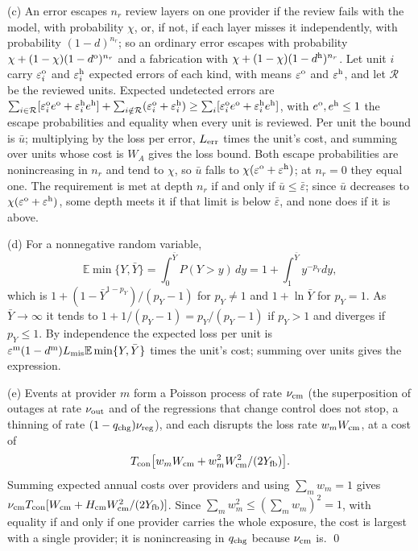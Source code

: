 (c) An error escapes $n_r$ review layers on one provider if the review fails with the model, with probability $\chi$, or, if not, if each layer misses it independently, with probability $(1-d)^{n_r}$; so an ordinary error escapes with probability $\chi+(1-\chi)(1-d^{\rm o})^{n_r}$ and a fabrication with $\chi+(1-\chi)(1-d^{\rm h})^{n_r}$. Let unit $i$ carry $\varepsilon^{\rm o}_i$ and $\varepsilon^{\rm h}_i$ expected errors of each kind, with means $\varepsilon^{\rm o}$ and $\varepsilon^{\rm h}$, and let $\mathcal R$ be the reviewed units. Expected undetected errors are $\sum_{i\in\mathcal R}[\varepsilon^{\rm o}_i e^{\rm o}+\varepsilon^{\rm h}_ie^{\rm h}]+\sum_{i\notin\mathcal R}(\varepsilon^{\rm o}_i+\varepsilon^{\rm h}_i)\ge\sum_i[\varepsilon^{\rm o}_ie^{\rm o}+\varepsilon^{\rm h}_ie^{\rm h}]$, with $e^{\rm o},e^{\rm h}\le1$ the escape probabilities and equality when every unit is reviewed. Per unit the bound is $\bar u$; multiplying by the loss per error, $L_{\rm err}$ times the unit's cost, and summing over units whose cost is $W_A$ gives the loss bound. Both escape probabilities are nonincreasing in $n_r$ and tend to $\chi$, so $\bar u$ falls to $\chi(\varepsilon^{\rm o}+\varepsilon^{\rm h})$; at $n_r=0$ they equal one. The requirement is met at depth $n_r$ if and only if $\bar u\le\bar\varepsilon$; since $\bar u$ decreases to $\chi(\varepsilon^{\rm o}+\varepsilon^{\rm h})$, some depth meets it if that limit is below $\bar\varepsilon$, and none does if it is above.

(d) For a nonnegative random variable,
\[
\mathbb E\min\{Y,\bar Y\}=\int_0^{\bar Y}P(Y>y)\,dy=1+\int_1^{\bar Y}y^{-p_Y}dy,
\]
which is $1+(1-\bar Y^{1-p_Y})/(p_Y-1)$ for $p_Y\ne1$ and $1+\ln\bar Y$ for $p_Y=1$. As $\bar Y\to\infty$ it tends to $1+1/(p_Y-1)=p_Y/(p_Y-1)$ if $p_Y>1$ and diverges if $p_Y\le1$. By independence the expected loss per unit is $\varepsilon^{\rm m}(1-d^{\rm m})L_{\rm mis}\mathbb E\min\{Y,\bar Y\}$ times the unit's cost; summing over units gives the expression.

(e) Events at provider $m$ form a Poisson process of rate $\nu_{\rm cm}$ (the superposition of outages at rate $\nu_{\rm out}$ and of the regressions that change control does not stop, a thinning of rate $(1-q_{\rm chg})\nu_{\rm reg}$), and each disrupts the loss rate $w_mW_{\rm cm}$, at a cost of
\[
T_{\rm con}\bigl[w_mW_{\rm cm}+w_m^2W_{\rm cm}^2/(2Y_{\rm fb})\bigr].
\]
Summing expected annual costs over providers and using $\sum_mw_m=1$ gives $\nu_{\rm cm}T_{\rm con}[W_{\rm cm}+H_{\rm cm}W_{\rm cm}^2/(2Y_{\rm fb})]$. Since $\sum_mw_m^2\le(\sum_mw_m)^2=1$, with equality if and only if one provider carries the whole exposure, the cost is largest with a single provider; it is nonincreasing in $q_{\rm chg}$ because $\nu_{\rm cm}$ is. \qed

